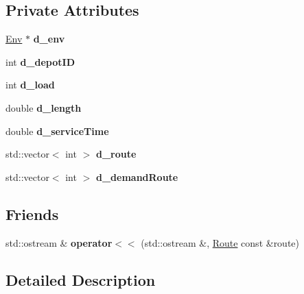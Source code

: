 \subsection*{Private Attributes}
\begin{DoxyCompactItemize}
\item 
\mbox{\label{class_route_a864524c91fba2fc3ad77f72758e15463}} 
\hyperlink{class_env}{Env} $\ast$ {\bfseries d\+\_\+env}
\item 
\mbox{\label{class_route_afb10c7df94462df3425c5fe19148124d}} 
int {\bfseries d\+\_\+depot\+ID}
\item 
\mbox{\label{class_route_a718e90948453ba308e72da01c38023e6}} 
int {\bfseries d\+\_\+load}
\item 
\mbox{\label{class_route_a229ec36dcf99986891d1b306f82e457f}} 
double {\bfseries d\+\_\+length}
\item 
\mbox{\label{class_route_a4c644f09b64e56e5d523e3177639b7fe}} 
double {\bfseries d\+\_\+service\+Time}
\item 
\mbox{\label{class_route_ab18028e7736ff42aab699f254e7feda1}} 
std\+::vector$<$ int $>$ {\bfseries d\+\_\+route}
\item 
\mbox{\label{class_route_a1c4627e94479ee1f587999c4e33e85e8}} 
std\+::vector$<$ int $>$ {\bfseries d\+\_\+demand\+Route}
\end{DoxyCompactItemize}
\subsection*{Friends}
\begin{DoxyCompactItemize}
\item 
\mbox{\label{class_route_a7a3934c69f6ee79cb2cd22502a7f4868}} 
std\+::ostream \& {\bfseries operator$<$$<$} (std\+::ostream \&, \hyperlink{class_route}{Route} const \&route)
\end{DoxyCompactItemize}


\subsection{Detailed Description}


